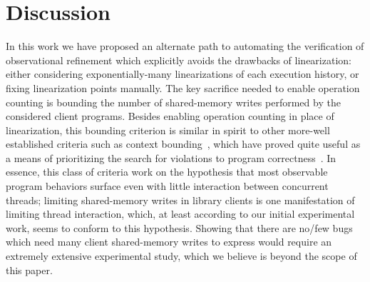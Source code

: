 \section{Discussion}
\label{sec:discussion}

In this work we have proposed an alternate path to automating the verification
of observational refinement which explicitly avoids the drawbacks of
linearization: either considering exponentially-many linearizations of each
execution history, or fixing linearization points manually. The key sacrifice
needed to enable operation counting is bounding the number of shared-memory
writes performed by the considered client programs. Besides enabling operation
counting in place of linearization, this bounding criterion is similar in
spirit to other more-well established criteria such as context bounding~\citep{
conf/tacas/QadeerR05}, which have proved quite useful as a means of
prioritizing the search for violations to program correctness~\citep{
conf/pldi/MusuvathiQ07}. In essence, this class of criteria work on the
hypothesis that most observable program behaviors surface even with little
interaction between concurrent threads; limiting shared-memory writes in
library clients is one manifestation of limiting thread interaction, which, at
least according to our initial experimental work, seems to conform to this
hypothesis. Showing that there are no/few bugs which need many client
shared-memory writes to express would require an extremely extensive
experimental study, which we believe is beyond the scope of this paper.
